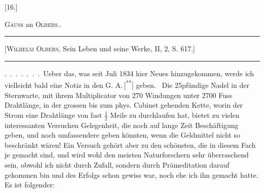 \clearpage\begingroup{}
\begin{center}[16.]\end{center}
\begin{center}\textsc{Gauss} an \textsc{Olbers}..\end{center}
\begingroup\renewcommand{\thefootnote}{}
\endgroup
\begin{center}\begin{minipage}{.88\linewidth}\centering\hrule\vspace{3pt}
\small [\textsc{Wilhelm Olbers}, Sein Leben und seine Werke, II, 2, S. 617.]
\par\vspace{3pt}\hrule\end{minipage}\end{center}
\noindent\hspace*{\parindent}.\ .\ .\ .\ .\ .\ .\ Ueber das, was seit Juli 1834 hier Neues hinzugekommen, werde
ich vielleicht bald eine Notiz in den G. A.\,[\textsuperscript{**}] geben.\begingroup\renewcommand{\thefootnote}{}
\endgroup\ Die 25pfündige Nadel in
der Sternwarte, mit ihrem Multiplicator von 270 Windungen unter 2700 Fuss
Drahtlänge, in der grossen bis zum phys. Cabinet gehenden Kette, worin der
Strom eine Drahtlänge von fast \(\frac{1}{2}\) Meile zu durchlaufen hat, bietet zu vielen
interessanten Versuchen Gelegenheit, die noch auf lange Zeit Beschäftigung
geben, und noch umfassendere geben könnten, wenn die Geldmittel nicht so
beschränkt wären! Ein Versuch gehört aber zu den schönsten, die in diesem
Fach je gemacht sind, und wird wohl den meisten Naturforschern sehr überraschend
sein, obwohl ich nicht durch Zufall, sondern durch Prämeditation
darauf gekommen bin und des Erfolgs schon gewiss war, noch ehe ich ihn
gemacht hatte. Es ist folgender:

